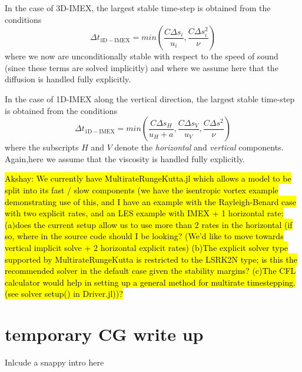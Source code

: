 \documentclass{report}
\numberwithin{equation}{section}
\begin{document}
In the case of 3D-IMEX, the largest stable time-step is obtained from the conditions
\[
\Delta t_{\mathrm{3D-IMEX}} = min \left( \frac{C \Delta s_i}{u_i}, \frac{C \Delta s_i^2}{\nu} \right)
\]
where we now are unconditionally stable with respect to the speed of sound (since these terms are solved implicitly) and where we assume here that the diffusion is handled fully explicitly.

In the case of 1D-IMEX along the vertical direction, the largest stable time-step is obtained from the conditions
\[
\Delta t_{\mathrm{1D-IMEX}} = min \left( \frac{C \Delta s_H}{u_H+a}, \frac{C \Delta s_V}{u_V}, \frac{C \Delta s^2}{\nu} \right)
\]
where the subscripts $H$ and $V$ denote the \emph{horizontal} and \emph{vertical} components. Again,here we assume that the viscosity is handled fully explicitly.

\hl{Akshay: We currently have MultirateRungeKutta.jl which allows a model to be split into its fast / slow components (we have the isentropic vortex example demonstrating use of this, and I have an example with the Rayleigh-Benard case with two explicit rates, and an LES example with IMEX + 1 horizontal rate: (a)does the current setup allow us to use more than 2 rates in the horizontal (if so, where in the source code should I be looking? (We'd like to move towards vertical implicit solve + 2 horizontal explicit rates) (b)The explicit solver type supported by MultirateRungeKutta is restricted to the LSRK2N type; is this the recommended solver in the default case given the stability margins? (c)The CFL calculator would help in setting up a general method for multirate timestepping. (see solver setup() in Driver.jl))?}

\chapter{temporary CG write up}

Inlcude a snappy intro here
\end{document}
